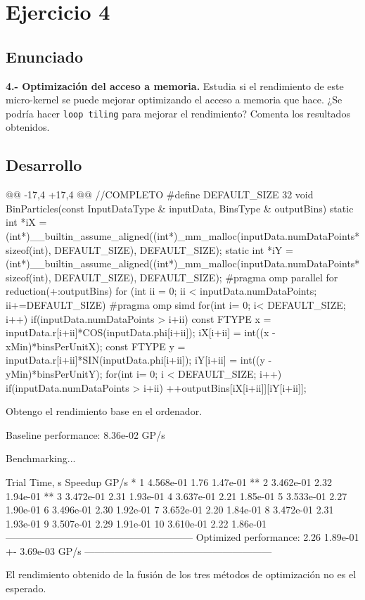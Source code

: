 \section{Ejercicio 4}
\subsection{Enunciado}
\begin{ejer}
    \textbf{4.- Optimización del acceso a memoria.} Estudia si el rendimiento de este micro-kernel se puede
    mejorar optimizando el acceso a memoria que hace. ¿Se podría hacer \texttt{loop tiling} para mejorar el
    rendimiento? Comenta los resultados obtenidos.
\end{ejer}
\subsection{Desarrollo}
\begin{listing}[firstnumber=16]
    @@ -17,4 +17,4 @@
    //COMPLETO
    #define DEFAULT_SIZE 32
    void BinParticles(const InputDataType & inputData, BinsType & outputBins) {
        static int *iX = (int*)__builtin_assume_aligned((int*)_mm_malloc(inputData.numDataPoints*sizeof(int), DEFAULT_SIZE), DEFAULT_SIZE);
        static int *iY = (int*)__builtin_assume_aligned((int*)_mm_malloc(inputData.numDataPoints*sizeof(int), DEFAULT_SIZE), DEFAULT_SIZE);
    #pragma omp parallel for reduction(+:outputBins)
        for (int ii = 0; ii < inputData.numDataPoints; ii+=DEFAULT_SIZE) {
    #pragma omp simd
            for(int i= 0; i< DEFAULT_SIZE; i++) {
                if(inputData.numDataPoints > i+ii) {
                    const FTYPE x = inputData.r[i+ii]*COS(inputData.phi[i+ii]); 
                    iX[i+ii] = int((x - xMin)*binsPerUnitX);
                    const FTYPE y = inputData.r[i+ii]*SIN(inputData.phi[i+ii]);
                    iY[i+ii] = int((y - yMin)*binsPerUnitY); 
                }
            }
            for(int i= 0; i < DEFAULT_SIZE; i++){
                if(inputData.numDataPoints > i+ii) 
                    ++outputBins[iX[i+ii]][iY[i+ii]];
            } 
        }
    }
\end{listing}
\par Obtengo el rendimiento base en el ordenador.
\begin{listing}[style=consola]
    Baseline performance: 8.36e-02 GP/s 
    
    Benchmarking...

        Trial Time, s       Speedup     GP/s *
            1 4.568e-01     1.76    1.47e-01 **
            2 3.462e-01     2.32    1.94e-01 **
            3 3.472e-01     2.31    1.93e-01
            4 3.637e-01     2.21    1.85e-01
            5 3.533e-01     2.27    1.90e-01
            6 3.496e-01     2.30    1.92e-01
            7 3.652e-01     2.20    1.84e-01
            8 3.472e-01     2.31    1.93e-01
            9 3.507e-01     2.29    1.91e-01
            10 3.610e-01    2.22    1.86e-01
    --------------------------------------------------------- 
    Optimized performance: 2.26 1.89e-01 +- 3.69e-03 GP/s 
    ---------------------------------------------------------
\end{listing}
\par El rendimiento obtenido de la fusión de los tres métodos de optimización no es el esperado.

